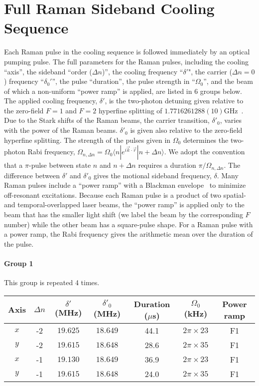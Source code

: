 
\chapter{Full Raman Sideband Cooling Sequence}
\label{appendex:rsc}

Each Raman pulse in the cooling sequence is followed immediately by an optical pumping pulse.
The full parameters for the Raman pulses, including the cooling ``axis'',
the sideband ``order ($\Delta n$)'', the cooling frequency ``$\delta '$",
the carrier ($\Delta n=0$) frequency ``$\delta_0'$'', the pulse ``duration'',
the pulse strength in ``$\Omega_0$'',
and the beam of which a non-uniform ``power ramp'' is applied, are listed in 6 groups below.
The applied cooling frequency, $\delta'$,
is the two-photon detuning given relative to the zero-field $F=1$ and $F=2$ hyperfine splitting
of $1.7716261288(10)$GHz~\cite{steck_sodium_nodate}.
Due to the Stark shifts of the Raman beams, the carrier transition, $\delta'_0$,
varies with the power of the Raman beams.
$\delta'_0$ is given also relative to the zero-field hyperfine splitting.
The strength of the pulses given in $\Omega_0$ determines the two-photon Rabi frequency,
$\Omega_{n,\Delta n}=\Omega_0 \langle n|e^{i \vec{k} \cdot \vec{r}}|n+\Delta n\rangle$.
We adopt the convention that a $\pi$-pulse between state $n$ and $n+\Delta n$ requires a duration $\pi/\Omega_{n,\Delta n}$.
The difference between $\delta'$ and $\delta'_0$ gives the motional sideband frequency, $\delta$.
Many Raman pulses include a ``power ramp'' with a Blackman envelope~\cite{kasevich_laser_1992} to minimize off-resonant excitations.
Because each Raman pulse is a product of two spatial- and temporal-overlapped laser beams,
the ``power ramp'' is applied only to the beam that has the smaller light shift
(we label the beam by the corresponding $F$ number) while the other beam has a square-pulse shape.
For a Raman pulse with a power ramp,
the Rabi frequency gives the arithmetic mean over the duration of the pulse.

\newpage
\subsubsection{Group 1}
This group is repeated 4 times.
\begin{center}
  \begin{tabular}{|c|c|c|c|c|c|c|}
    \hline
    Axis&$\Delta n$&$\delta'$ (MHz)&$\delta'_0$ (MHz)&Duration ($\mu$s)& $\Omega_0$ (kHz)&Power ramp\\\hline
    $x$&-2&$19.625$&$18.649$&44.1&$2\pi\times23$&F1\\\hline
    $y$&-2&$19.615$&$18.648$&28.6&$2\pi\times35$&F1\\\hline
    $x$&-1&$19.130$&$18.649$&36.9&$2\pi\times23$&F1\\\hline
    $y$&-1&$19.615$&$18.648$&24.0&$2\pi\times35$&F1\\\hline
  \end{tabular}
\end{center}

